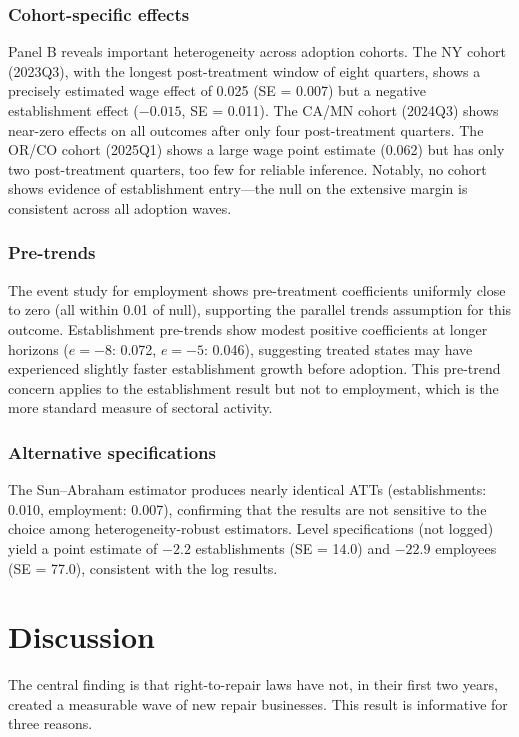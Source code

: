 \documentclass[12pt]{article}
\begin{document}
\subsubsection*{Cohort-specific effects} Panel B reveals important heterogeneity across adoption cohorts. The NY cohort (2023Q3), with the longest post-treatment window of eight quarters, shows a precisely estimated wage effect of 0.025 (SE = 0.007) but a negative establishment effect ($-0.015$, SE = 0.011). The CA/MN cohort (2024Q3) shows near-zero effects on all outcomes after only four post-treatment quarters. The OR/CO cohort (2025Q1) shows a large wage point estimate (0.062) but has only two post-treatment quarters, too few for reliable inference. Notably, no cohort shows evidence of establishment entry---the null on the extensive margin is consistent across all adoption waves.

\subsubsection*{Pre-trends} The event study for employment shows pre-treatment coefficients uniformly close to zero (all within 0.01 of null), supporting the parallel trends assumption for this outcome. Establishment pre-trends show modest positive coefficients at longer horizons ($e = -8$: 0.072, $e = -5$: 0.046), suggesting treated states may have experienced slightly faster establishment growth before adoption. This pre-trend concern applies to the establishment result but not to employment, which is the more standard measure of sectoral activity.

\subsubsection*{Alternative specifications} The Sun--Abraham estimator produces nearly identical ATTs (establishments: 0.010, employment: 0.007), confirming that the results are not sensitive to the choice among heterogeneity-robust estimators. Level specifications (not logged) yield a point estimate of $-2.2$ establishments (SE = 14.0) and $-22.9$ employees (SE = 77.0), consistent with the log results.

\section{Discussion}

The central finding is that right-to-repair laws have not, in their first two years, created a measurable wave of new repair businesses. This result is informative for three reasons.
\end{document}
